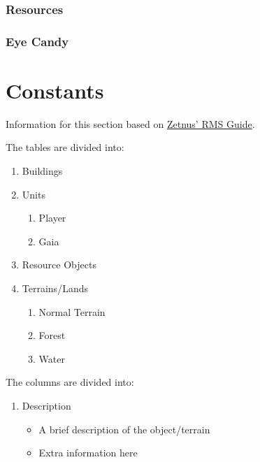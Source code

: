 \documentclass[]{article}
\providecommand{\tightlist}{%
  \setlength{\itemsep}{0pt}\setlength{\parskip}{0pt}}
\theoremstyle{plain}
\theoremstyle{remark}
\theoremstyle{definition}
\begin{document}
\hypertarget{resources}{%
\subsubsection{Resources}\label{resources}}

\hypertarget{eye-candy}{%
\subsubsection{Eye Candy}\label{eye-candy}}

\hypertarget{constants-1}{%
\section{Constants}\label{constants-1}}

Information for this section based on
\href{http://aok.heavengames.com/blacksmith/showfile.php?fileid=12178}{Zetnus'
RMS Guide}.

The tables are divided into:

\begin{enumerate}
\def\labelenumi{\arabic{enumi}.}
\tightlist
\item
  Buildings
\item
  Units

  \begin{enumerate}
  \def\labelenumii{\roman{enumii})}
  \tightlist
  \item
    Player
  \item
    Gaia
  \end{enumerate}
\item
  Resource Objects
\item
  Terrains/Lands

  \begin{enumerate}
  \def\labelenumii{\roman{enumii})}
  \tightlist
  \item
    Normal Terrain
  \item
    Forest
  \item
    Water
  \end{enumerate}
\end{enumerate}

The columns are divided into:

\begin{enumerate}
\def\labelenumi{\arabic{enumi}.}
\tightlist
\item
  Description

  \begin{itemize}
  \tightlist
  \item
    A brief description of the object/terrain
  \item
    Extra information here
  \end{itemize}
\end{enumerate}
\end{document}
